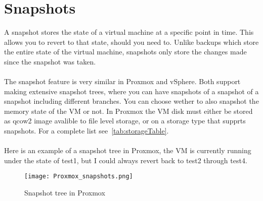 \section{Snapshots}

A snapshot stores the state of a virtual machine at a specific point in time. This allows you to revert to that state, should you need to. Unlike backups which store the entire state of the virtual machine, snapshots only store the changes made since the snapshot was taken.
\\\\
The snapshot feature is very similar in Proxmox and vSphere. Both support making extensive snapshot trees, where you can have snapshots of a snapshot of a snapshot including different branches. You can choose wether to also snapshot the memory state of the VM or not. In Proxmox the VM disk must either be stored as qcow2 image avalible to file level storage, or on a storage type that supprts snapshots. For a complete list see~\ref{tab:storageTable}.
\\\\
Here is an example of a snapshot tree in Proxmox, the VM is currently running under the state of test1, but I could always revert back to test2 through test4.

\begin{figure}[H]
	\centering
	\texttt{[image: Proxmox\_snapshots.png]} %
	\caption{Snapshot tree in Proxmox} %
	\label{fig:Snapshot tree in Proxmox} %
\end{figure}